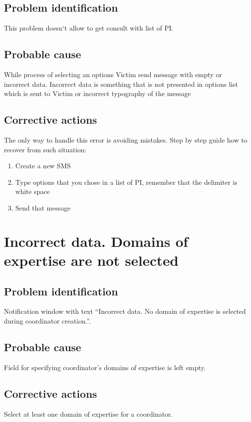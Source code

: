 \subsection{Problem identification}
This problem doesn`t allow to get consult with list of PI. 

\subsection{Probable cause}
While process of selecting an options Victim send message with empty or incorrect data. Incorrect data is something that is not presented in options list which is sent to Victim or incorrect typography of the message

\subsection{Corrective actions}
The only way to handle this error is avoiding mistakes. Step by step guide how to recover from such situation:
\begin{enumerate}
  \item Create a new SMS
  \item Type options that you chose in a list of PI, remember that the delimiter
  is white space
  \item Send that message
\end{enumerate}

\section{Incorrect data. Domains of expertise are not selected}

\subsection{Problem identification}
Notification window with text ``Incorrect data. No domain of expertise is
selected during coordinator creation.''.

\subsection{Probable cause}
Field for specifying coordinator’s domains of expertise is left empty.

\subsection{Corrective actions}
Select at least one domain of expertise for a coordinator.

